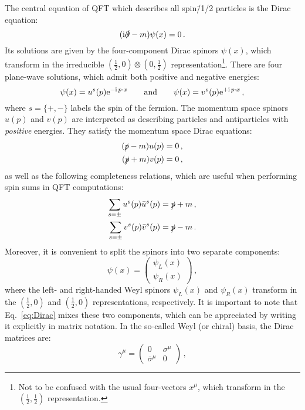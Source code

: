 \documentclass[main.tex]{subfiles}
\begin{document}
The central equation of QFT which describes all spin\=/1/2 particles is the Dirac equation:
\begin{equation} \label{eq:Dirac}
    (\mathrm{i} \slashed{\partial}-m)\psi(x) = 0\,.
\end{equation}
Its solutions are given by the four-component Dirac spinors $\psi(x)$, which transform in the irreducible $\left(\frac{1}{2}, 0\right) \otimes \left(0, \frac{1}{2}\right)$ representation\footnote{Not to be confused with the usual four-vectors $x^\mu$, which transform in the $\left(\frac{1}{2}, \frac{1}{2}\right)$ representation.}. There are four plane-wave solutions, which admit both positive and negative energies:
\begin{equation}
    \psi(x) = u^s(p)\mathrm{e}^{-\mathrm{i}\, p\cdot x} \qquad \text{and} \qquad \psi(x) = v^s(p)\mathrm{e}^{+\mathrm{i}\, p\cdot x}\,,
\end{equation}
where $s=\{+, -\}$ labels the spin of the fermion. The momentum space spinors $u(p)$ and $v(p)$ are interpreted as describing particles and antiparticles with \textit{positive} energies. They satisfy the momentum space Dirac equations: 
\begin{align}
    (\slashed{p} - m)u(p) &= 0\,, \nonumber \\
    (\slashed{p} + m)v(p) &= 0\,,
\end{align}
as well as the following completeness relations, which are useful when performing spin sums in QFT computations:
\begin{align} \label{eq:completeness:fermions}
    \sum_{s=\pm} u^s(p)\bar{u}^s(p) &= \slashed{p} + m\, \nonumber, \\
    \sum_{s=\pm} v^s(p)\bar{v}^s(p) &= \slashed{p} - m\,.
\end{align}
Moreover, it is convenient to split the spinors into two separate components:
\begin{equation}
    \psi(x) = 
    \begin{pmatrix}
        \psi_L(x) \\
        \psi_R(x)
    \end{pmatrix}\,,
\end{equation}
where the left- and right-handed Weyl spinors $\psi_L(x)$ and $\psi_R(x)$ transform in the $\left(\frac{1}{2}, 0 \right)$ and $\left(\frac{1}{2}, 0 \right)$ representations, respectively. It is important to note that Eq.~\ref{eq:Dirac} mixes these two components, which can be appreciated by writing it explicitly in matrix notation. In the so-called Weyl (or chiral) basis, the Dirac matrices are:
\begin{equation}
    \gamma^\mu = 
    \begin{pmatrix}
        0 & \sigma^\mu \\
        \bar{\sigma}^\mu & 0
    \end{pmatrix}\,,
\end{equation}
\end{document}
